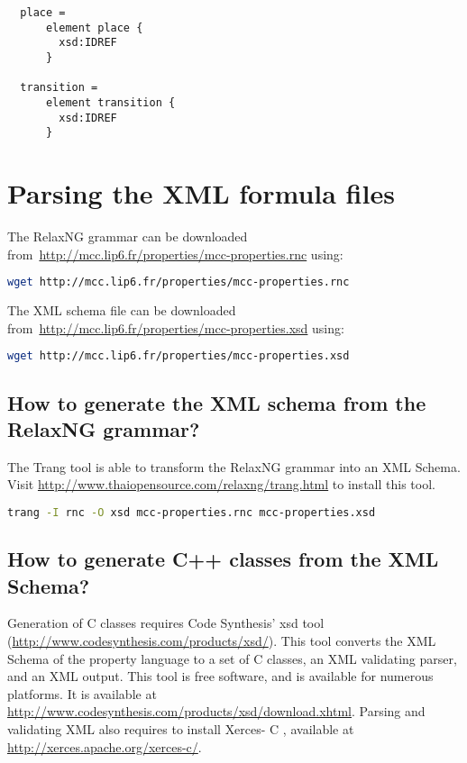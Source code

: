 \documentclass[10pt,english,a4paper]{article}
\newcommand{\CC}{%
  C\nolinebreak\hspace{-.05em}\raisebox{.4ex}{\scriptsize\bf +}\nolinebreak\hspace{-.10em}\raisebox{.4ex}{\scriptsize\bf +}%
}
\begin{document}
\begin{lstlisting}
  place =
      element place {
        xsd:IDREF
      }

  transition =
      element transition {
        xsd:IDREF
      }
\end{lstlisting}

\iffalse
\section{Parsing the XML formula files}
\label{s:parsing}

The RelaxNG grammar can be downloaded from~\url{http://mcc.lip6.fr/properties/mcc-properties.rnc} using:
\begin{lstlisting}[language=sh]
  wget http://mcc.lip6.fr/properties/mcc-properties.rnc
\end{lstlisting}

The XML schema file can be downloaded from~\url{http://mcc.lip6.fr/properties/mcc-properties.xsd} using:
\begin{lstlisting}[language=sh]
  wget http://mcc.lip6.fr/properties/mcc-properties.xsd
\end{lstlisting}

\subsection{How to generate the XML schema from the RelaxNG grammar?}
The Trang tool is able to transform the RelaxNG grammar into an XML Schema.
Visit \url{http://www.thaiopensource.com/relaxng/trang.html} to install this tool.

\begin{lstlisting}[language=sh]
  trang -I rnc -O xsd mcc-properties.rnc mcc-properties.xsd
\end{lstlisting}

\subsection{How to generate C++ classes from the XML Schema?}
Generation of {\CC} classes requires Code Synthesis' xsd tool
(\url{http://www.codesynthesis.com/products/xsd/}).
This tool converts the XML Schema of the property language to a set of \CC{} classes,
an XML validating parser, and an XML output.
This tool is free software, and is available for numerous platforms.
It is available at \url{http://www.codesynthesis.com/products/xsd/download.xhtml}.
Parsing and validating XML also requires to install Xerces-\CC{},
available at \url{http://xerces.apache.org/xerces-c/}.
\end{document}
